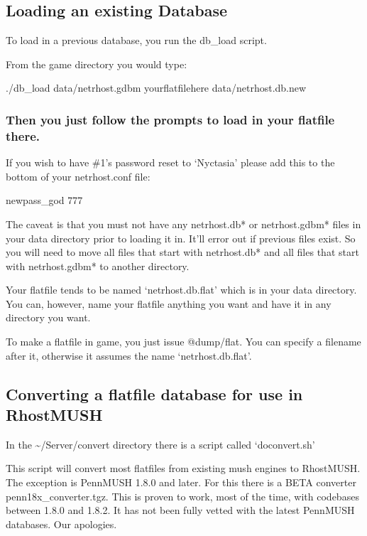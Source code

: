 \documentclass[letterpaper,10pt,english]{sphinxmanual}
\begin{document}
\subsection{Loading an existing Database}
\label{\detokenize{database:loading-an-existing-database}}
\sphinxAtStartPar
To load in a previous database, you run the db\_load script.

\sphinxAtStartPar
From the game directory you would type:

\sphinxAtStartPar
./db\_load data/netrhost.gdbm yourflatfilehere data/netrhost.db.new


\subsubsection{Then you just follow the prompts to load in your flatfile there.}
\label{\detokenize{database:then-you-just-follow-the-prompts-to-load-in-your-flatfile-there}}
\sphinxAtStartPar
If you wish to have \#1’s password reset to ‘Nyctasia’ please add this
to the bottom of your netrhost.conf file:

\sphinxAtStartPar
newpass\_god 777

\sphinxAtStartPar
The caveat is that you must not have any netrhost.db* or netrhost.gdbm* files
in your data directory prior to loading it in.  It’ll error out if previous
files exist.  So you will need to move all files that start with netrhost.db*
and all files that start with netrhost.gdbm* to another directory.

\sphinxAtStartPar
Your flatfile tends to be named ‘netrhost.db.flat’ which is in your data
directory.  You can, however, name your flatfile anything you want and have
it in any directory you want.

\sphinxAtStartPar
To make a flatfile in game, you just issue @dump/flat.  You can specify
a filename after it, otherwise it assumes the name ‘netrhost.db.flat’.


\subsection{Converting a flatfile database for use in RhostMUSH}
\label{\detokenize{database:converting-a-flatfile-database-for-use-in-rhostmush}}
\sphinxAtStartPar
In the \textasciitilde{}/Server/convert directory there is a script called ‘doconvert.sh’

\sphinxAtStartPar
This script will convert most flatfiles from existing mush engines to
RhostMUSH.  The exception is PennMUSH 1.8.0 and later.  For this there is a
BETA converter penn18x\_converter.tgz.  This is proven to work, most of the time,
with codebases between 1.8.0 and 1.8.2.  It has not been fully vetted with
the latest PennMUSH databases.  Our apologies.
\end{document}
